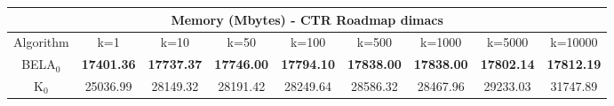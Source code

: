 \begin{tabular}{c|cccccccc}\toprule
\multicolumn{9}{c}{Memory (Mbytes) - CTR Roadmap dimacs}\\ \midrule
Algorithm & k=1 & k=10 & k=50 & k=100 & k=500 & k=1000 & k=5000 & k=10000 \\ \midrule
BELA$_0$ & \textbf{17401.36} & \textbf{17737.37} & \textbf{17746.00} & \textbf{17794.10} & \textbf{17838.00} & \textbf{17838.00} & \textbf{17802.14} & \textbf{17812.19} \\
K$_0$ & 25036.99 & 28149.32 & 28191.42 & 28249.64 & 28586.32 & 28467.96 & 29233.03 & 31747.89 \\ \bottomrule 
\end{tabular}
